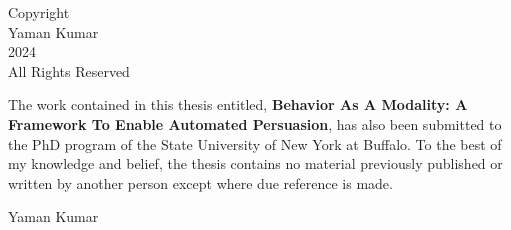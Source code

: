 

\setcounter{page}{2}

\vspace*{\fill}
\begin{center}
    {\large Copyright} \\ %
    \vspace{0.5cm} %
    {\large Yaman Kumar} \\
    \vspace{0.5cm}
    {\large 2024} \\
    \vspace{0.5cm}
    {\large All Rights Reserved}
\end{center}
\vspace*{\fill} %

\newpage

\certificate

\vspace*{0.5in}


\noindent  The work contained in this thesis entitled, \textbf{Behavior As A Modality: A Framework To Enable Automated Persuasion}, has also been submitted to the PhD program of the State University of New York at Buffalo. To the best of my knowledge and belief, the thesis contains no material previously published or written by another person except where due reference is made.

\vspace*{0.5in}

\noindent Yaman Kumar

\vspace*{1in}

